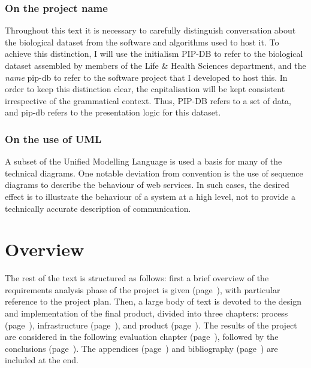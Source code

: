 \subsubsection*{On the project name}
Throughout this text it is necessary to carefully distinguish
conversation about the biological dataset from the software and
algorithms used to host it. To achieve this distinction, I will use
the initialism PIP-DB to refer to the biological dataset assembled by
members of the Life \& Health Sciences department, and the
\textit{name} pip-db to refer to the software project that I developed
to host this. In order to keep this distinction clear, the
capitalisation will be kept consistent irrespective of the grammatical
context. Thus, PIP-DB refers to a set of data, and pip-db refers to
the presentation logic for this dataset.


\subsubsection*{On the use of UML}
A subset of the Unified Modelling Language \cite{ibm2003uml} is used a
basis for many of the technical diagrams. One notable deviation from
convention is the use of sequence diagrams \cite{ibm2004sequence} to
describe the behaviour of web services. In such cases, the desired
effect is to illustrate the behaviour of a system at a high level, not
to provide a technically accurate description of communication.


\section*{Overview}\label{sec:overview}
The rest of the text is structured as follows: first a brief overview
of the requirements analysis phase of the project is given
(page~\pageref{chap:requirements}), with particular reference to the
project plan. Then, a large body of text is devoted to the design and
implementation of the final product, divided into three chapters:
process (page~\pageref{chap:process}), infrastructure
(page~\pageref{chap:infrastructure}), and product
(page~\pageref{chap:product}). The results of the project are
considered in the following evaluation chapter
(page~\pageref{chap:evaluation}), followed by the conclusions
(page~\pageref{chap:conclusions}). The appendices
(page~\pageref{appendices}) and bibliography
(page~\pageref{bibliography}) are included at the end.
